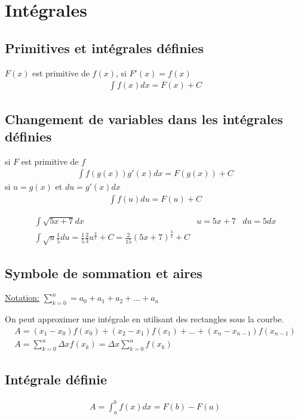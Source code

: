 \chapter{Intégrales}
\section{Primitives et intégrales définies}
$F(x)$ est primitive de $f(x)$, si $F'(x)=f(x)$
\begin{eqnarray}
	\int f(x)dx=F(x)+C
\end{eqnarray}
\section{Changement de variables dans les intégrales définies}
si $F$ est primitive de $f$
\begin{eqnarray}
	\int f(g(x))g'(x)dx=F(g(x))+C
\end{eqnarray}
si $u=g(x)$ et $du=g'(x)dx$
\begin{eqnarray}
	\int f(u)du=F(u)+C
\end{eqnarray}

\begin{myExample}

	\begin{eqnarray*}
		\int\sqrt{5x+7}dx & u=5x+7 & du=5dx
		\\
		\int\sqrt u\frac{1}{5}du=\frac{1}{5}\frac{2}{3}u^{\frac{3}{2}}+C=\frac{2}{15}(5x+7)^{\frac{3}{2}}+C
	\end{eqnarray*}
	
\end{myExample}

\section{Symbole de sommation et aires}
\underline{Notation:} $\sum_{k=0}^{n}=a_0+a_1+a_2+\dots+a_n$

On peut approximer une intégrale en utilisant des rectangles sous la courbe.
\begin{eqnarray*}
	A=(x_1-x_0)f(x_0)+(x_2-x_1)f(x_1)+\dots+(x_n-x_{n-1})f(x_{n-1})
	\\
	A=\sum_{k=0}^{n}\Delta xf(x_k)=\Delta x\sum_{k=0}^nf(x_k)
\end{eqnarray*}

\section{Intégrale définie}
\begin{eqnarray}
	A=\int_a^bf(x)dx=F(b)-F(a)
\end{eqnarray}

